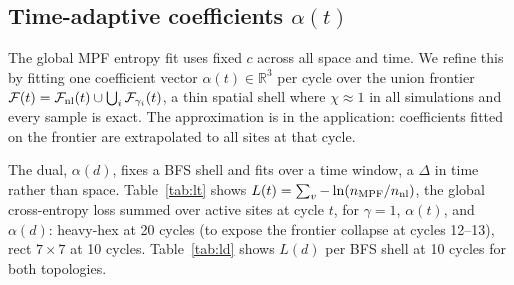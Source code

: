 \documentclass[letterpaper]{article}
\begin{document}
\subsection{Time-adaptive coefficients $\alpha(t)$}

The global MPF entropy fit uses fixed $c$ across all space and time.
We refine this by fitting one coefficient vector $\alpha(t)\in\mathbb{R}^3$
per cycle over the union frontier
$\mathcal{F}(t) = \mathcal{F}_{\rm nl}(t) \cup \bigcup_i \mathcal{F}_{\gamma_i}(t)$,
a thin spatial shell where $\chi\approx1$ in all simulations and every
sample is exact.
The approximation is in the application: coefficients fitted on the
frontier are extrapolated to all sites at that cycle.

The dual, $\alpha(d)$, fixes a BFS shell and fits over a time window,
a $\Delta$ in time rather than space.
Table~\ref{tab:lt} shows $L(t) = \sum_v -\ln(n_{\rm MPF}/n_{\rm nl})$,
the global cross-entropy loss summed over active sites at cycle $t$, for $\gamma=1$, $\alpha(t)$,
and $\alpha(d)$: heavy-hex at 20 cycles (to expose the frontier
collapse at cycles 12--13), rect $7\times7$ at 10 cycles.
Table~\ref{tab:ld} shows $L(d)$ per BFS shell at 10 cycles for both
topologies.
\end{document}
